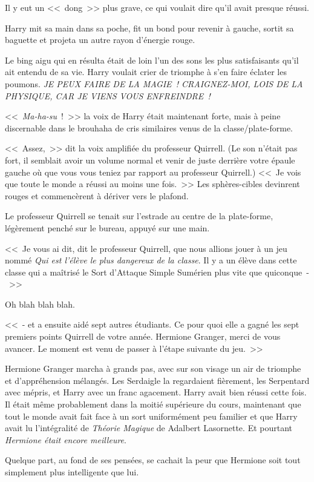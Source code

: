 Il y eut un <<~dong~>> plus grave, ce qui voulait dire qu'il avait presque réussi.

Harry mit sa main dans sa poche, fit un bond pour revenir à gauche, sortit sa baguette et projeta un autre rayon d'énergie rouge.

Le bing aigu qui en résulta était de loin l'un des sons les plus satisfaisants qu'il ait entendu de sa vie. Harry voulait crier de triomphe à s'en faire éclater les poumons. \emph{JE PEUX FAIRE DE LA MAGIE~! CRAIGNEZ-MOI, LOIS DE LA PHYSIQUE, CAR JE VIENS VOUS ENFREINDRE~!}

<<~\emph{Ma-ha-su}~!~>> la voix de Harry était maintenant forte, mais à peine discernable dans le brouhaha de cris similaires venus de la classe/plate-forme.

<<~Assez,~>> dit la voix amplifiée du professeur Quirrell. (Le son n'était pas fort, il semblait avoir un volume normal et venir de juste derrière votre épaule gauche où que vous vous teniez par rapport au professeur Quirrell.) <<~Je vois que toute le monde a réussi au moins une fois.~>> Les sphères-cibles devinrent rouges et commencèrent à dériver vers le plafond.

Le professeur Quirrell se tenait sur l'estrade au centre de la plate-forme, légèrement penché sur le bureau, appuyé sur une main.

<<~Je vous ai dit, dit le professeur Quirrell, que nous allions jouer à un jeu nommé \emph{Qui est l'élève le plus dangereux de la classe}. Il y a un élève dans cette classe qui a maîtrisé le Sort d'Attaque Simple Sumérien plus vite que quiconque~-~>>

Oh blah blah blah.

<<~- et a ensuite aidé sept autres étudiants. Ce pour quoi elle a gagné les sept premiers points Quirrell de votre année. Hermione Granger, merci de vous avancer. Le moment est venu de passer à l'étape suivante du jeu.~>>

Hermione Granger marcha à grands pas, avec sur son visage un air de triomphe et d'appréhension mélangés. Les Serdaigle la regardaient fièrement, les Serpentard avec mépris, et Harry avec un franc agacement. Harry avait bien réussi cette fois. Il était même probablement dans la moitié supérieure du cours, maintenant que tout le monde avait fait face à un sort uniformément peu familier et que Harry avait lu l'intégralité de \emph{Théorie Magique} de Adalbert Lasornette. Et pourtant \emph{Hermione était encore meilleure}.

Quelque part, au fond de ses pensées, se cachait la peur que Hermione soit tout simplement plus intelligente que lui.


